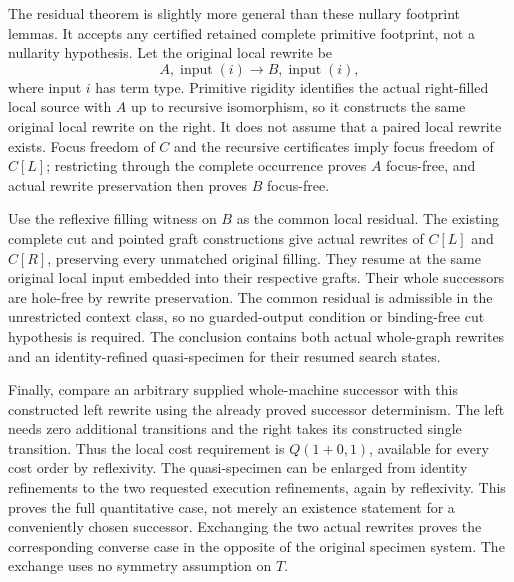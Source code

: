 The residual theorem is slightly more general than these nullary footprint
lemmas. It accepts any certified retained complete primitive footprint,
not a nullarity hypothesis. Let the original local rewrite be
\[
 A,\operatorname{input}(i)\longrightarrow
 B,\operatorname{input}(i),
\]
where input $i$ has term type. Primitive rigidity identifies the actual
right-filled local source with $A$ up to recursive isomorphism, so it
constructs the same original local rewrite on the right. It does not
assume that a paired local rewrite exists. Focus freedom of $C$ and the
recursive certificates imply focus freedom of $C[L]$; restricting through
the complete occurrence proves $A$ focus-free, and actual rewrite
preservation then proves $B$ focus-free.

Use the reflexive filling witness on $B$ as the common local residual.
The existing complete cut and pointed graft constructions give actual
rewrites of $C[L]$ and $C[R]$, preserving every unmatched original filling.
They resume at the same original local input embedded into their respective
grafts. Their whole successors are hole-free by rewrite preservation.
The common residual is admissible in the unrestricted context class, so
no guarded-output condition or binding-free cut hypothesis is required.
The conclusion contains both actual whole-graph rewrites and an
identity-refined quasi-specimen for their resumed search states.

\par{}


Finally, compare an arbitrary supplied whole-machine successor with this
constructed left rewrite using the already proved successor determinism.
The left needs zero additional transitions and the right takes its
constructed single transition. Thus the local cost requirement is
$Q(1+0,1)$, available for every cost order by reflexivity. The quasi-specimen
can be enlarged from identity refinements to the two requested execution
refinements, again by reflexivity. This proves the full quantitative case,
not merely an existence statement for a conveniently chosen successor.
Exchanging the two actual rewrites proves the corresponding converse case
in the opposite of the original specimen system. The exchange uses no
symmetry assumption on $T$.

\par{}
